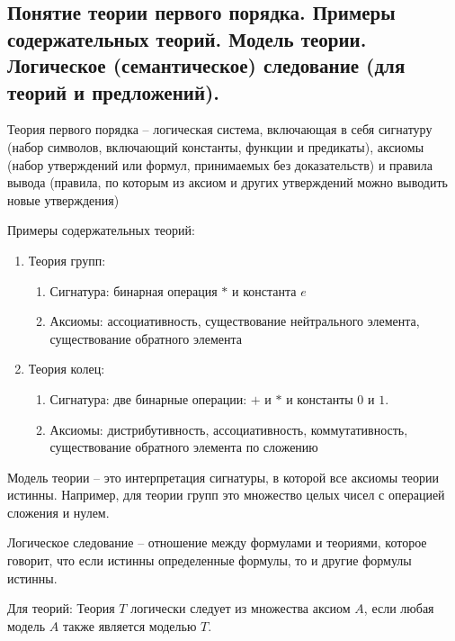 \documentclass[a4paper, 10pt]{article}
\begin{document}
\subsection{Понятие теории первого порядка. Примеры содержательных теорий. Модель теории. Логическое (семантическое) следование (для теорий и предложений).}

Теория первого порядка -- логическая система, включающая в себя сигнатуру (набор символов, включающий константы, функции и предикаты), аксиомы (набор утверждений или формул, принимаемых без доказательств) и правила вывода (правила, по которым из аксиом и других утверждений можно выводить новые утверждения)

\hfill

Примеры содержательных теорий:

\begin{enumerate}
    \item Теория групп:
    \begin{enumerate}
        \item Сигнатура: бинарная операция $*$ и константа $e$
        \item Аксиомы: ассоциативность, существование нейтрального элемента, существование обратного элемента
    \end{enumerate}
    \item Теория колец:
    \begin{enumerate}
        \item Сигнатура: две бинарные операции: $+$ и $*$ и константы $0$ и $1$.
        \item Аксиомы: дистрибутивность, ассоциативность, коммутативность, существование обратного элемента по сложению
    \end{enumerate}
\end{enumerate}

Модель теории -- это интерпретация сигнатуры, в которой все аксиомы теории истинны. Например, для теории групп это множество целых чисел с операцией сложения и нулем.

\hfill

Логическое следование -- отношение между формулами и теориями, которое говорит, что если истинны определенные формулы, то и другие формулы истинны.

Для теорий: Теория $T$ логически следует из множества аксиом $A$, если любая модель $A$ также является моделью $T$.
\end{document}
